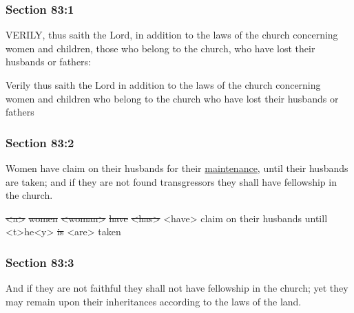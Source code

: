 	\subsubsection{Section 83:1} %
		\label{DC83-1}

		VERILY, thus saith the Lord, in addition to the laws of the church concerning women and children, those who belong to the church, who have lost their husbands or fathers:

		\begin{framed}
		\scriptsize
			\begin{compactdesc}
				\item[JSP] Verily thus saith the Lord in addition to the laws of the church concerning women and children who belong to the church who have lost their husbands or fathers
			\end{compactdesc}
		\end{framed}

	\subsubsection{Section 83:2} %
		\label{DC83-2}

		Women have claim on their husbands for their \hyperref[MAINTENANCE]{maintenance}, until their husbands are taken; and if they are not found transgressors they shall have fellowship in the church.

		\begin{framed}
		\scriptsize
			\begin{compactdesc}
				\item[JSP] \sout{<a>} \sout{women} \sout{<woman>} \sout{have} \sout{<has>} <have> claim on their husbands untill <t>he<y> \sout{is} <are> taken
			\end{compactdesc}
		\end{framed}

	\subsubsection{Section 83:3} %
		\label{DC83-3}

		And if they are not faithful they shall not have fellowship in the church; yet they may remain upon their inheritances according to the laws of the land.

